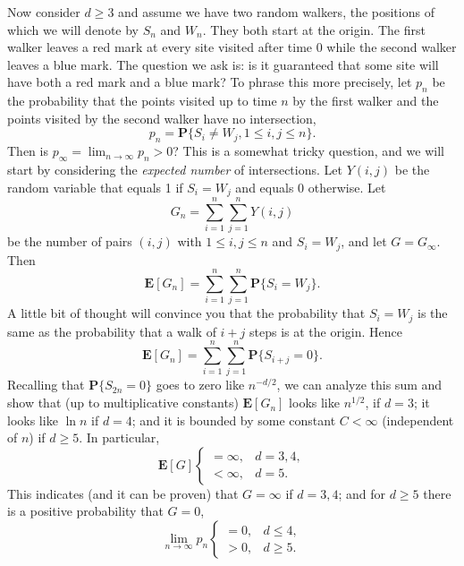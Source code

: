 \documentclass{stml-l}
\theoremstyle{definition}
\numberwithin{equation}{chapter}
\numberwithin{figure}{chapter}
\numberwithin{figure}{section}
\begin{document}
Now consider $d\geq 3$ and assume we have two random walkers, the
positions of which we will denote by $S_{n}$ and $W_{n}$. They both
start at the origin. The first walker leaves a red mark at every
site visited after time $0$ while the second walker leaves a blue
mark. The question we ask is: is it guaranteed that some site will
have both a red mark and a blue mark? To phrase this more precisely,
let $p_{n}$ be the probability that the points visited up to time
$n$ by the first walker and the points visited by the second walker
have no intersection,
\begin{equation*}
p_{n}=\mathbf{P}\{S_{i}\neq W_{j},1\leq i,j\leq n\}.
\end{equation*}
Then is $p_{\infty}=\lim_{n\rightarrow\infty}p_{n}>0$? This is a
somewhat tricky question, and we will start by considering the
\emph{expected number} of intersections. Let $Y(i,j)$ be the random
variable that equals 1 if $S_{i}=W_{j}$ and equals $0$ otherwise.
Let
\begin{equation*}
G_{n}=\sum\limits_{i=1}^{n}\sum\limits_{j=1}^{n}Y(i,j)
\end{equation*}
be the number of pairs $(i,j)$ with $1\leq i,j\leq n$ and
$S_{i}=W_{j}$, and let $G=G_{\infty}$. Then
\begin{equation*}
\mathbf{E}[G_{n}]=\sum\limits_{i=1}^{n}\sum\limits_{j=1}^{n}\mathbf{P}\{S_{i}=W_{j}\}.
\end{equation*}
A little bit of thought will convince you that the probability that
$S_{i}=W_{j}$ is the same as the probability that a walk of $i+j$
steps is at the origin. Hence
\begin{equation*}
\mathbf{E}[G_{n}]=\sum_{i=1}^{n}\sum_{j=1}^{n}\mathbf{P}\{S_{i+j}=0\}.
\end{equation*}
Recalling that $\mathbf{P}\{S_{2n}=0\}$ goes to zero like
$n^{-d/2}$, we can analyze this sum and show that (up to
multiplicative constants) $\mathbf{E}[G_{n}]$ looks like $n^{1/2}$,
if $d=3$; it looks like $\ln n$ if $d=4$; and it is bounded by some
constant $ C<\infty$ (independent of $n$) if $d\geq 5$. In
particular,
\begin{equation*}
\mathbf{E}[G]\begin{cases}
=\infty,& d=3,4,\\
<\infty,& d=5.
\end{cases}
\end{equation*}
This indicates (and it can be proven) that $ G=\infty$ if $d=3,4$;
and for $d\geq 5$ there is a positive probability that $G=0$,
\begin{equation*}
\lim\limits_{n\rightarrow\infty}p_{n}\begin{cases}
=0,& d\leq 4,\\
>0,& d\geq 5.
\end{cases}
\end{equation*}
\end{document}
